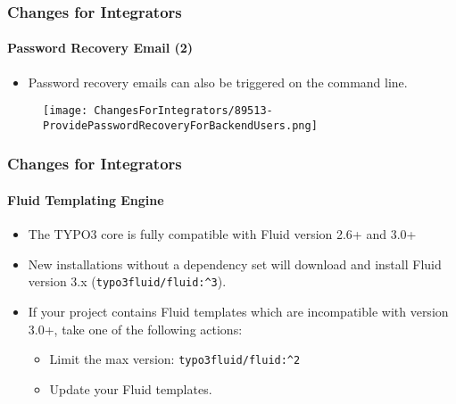 
\begin{frame}[fragile]
	\frametitle{Changes for Integrators}
	\framesubtitle{Password Recovery Email (2)}

	\begin{itemize}
		\item Password recovery emails can also be triggered on the command line.
	\end{itemize}

	\begin{figure}
		\texttt{[image: ChangesForIntegrators/89513-ProvidePasswordRecoveryForBackendUsers.png]}
	\end{figure}

\end{frame}


\begin{frame}[fragile]
	\frametitle{Changes for Integrators}
	\framesubtitle{Fluid Templating Engine}

	\begin{itemize}
		\item The TYPO3 core is fully compatible with Fluid version 2.6+ and 3.0+
		\item New installations without a dependency set will download and install Fluid version 3.x
			(\texttt{typo3fluid/fluid:\^{}3}).
		\item If your project contains Fluid templates which are incompatible with version 3.0+,
			take one of the following actions:

			\begin{itemize}
				\item Limit the max version: \texttt{typo3fluid/fluid:\^{}2}
				\item Update your Fluid templates.
			\end{itemize}

	\end{itemize}

\end{frame}



